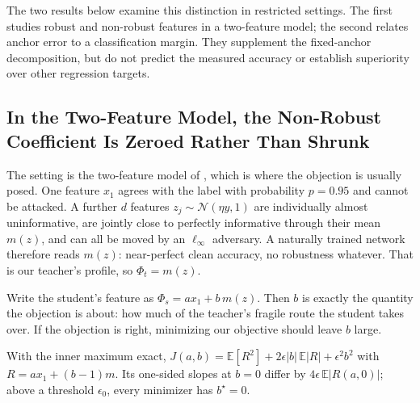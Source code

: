 The two results below examine this distinction in restricted settings. The first studies robust
and non-robust features in a two-feature model; the second relates anchor error to a classification
margin. They supplement the fixed-anchor decomposition, but do not predict the measured accuracy
or establish superiority over other regression targets.

\subsection{In the Two-Feature Model, the Non-Robust Coefficient Is Zeroed Rather Than Shrunk}

The setting is the two-feature model of \citet{tsipras2018robustness}, which is where the objection is
usually posed. One feature $x_1$ agrees with the label with probability $p = 0.95$ and cannot be
attacked. A further $d$ features $z_j \sim \mathcal{N}(\eta y, 1)$ are individually almost
uninformative, are jointly close to perfectly informative through their mean $m(z)$, and can all be
moved by an $\ell_\infty$ adversary. A naturally trained network therefore reads $m(z)$: near-perfect
clean accuracy, no robustness whatever. That is our teacher's profile, so $\Phi_t = m(z)$.

Write the student's feature as $\Phi_s = a x_1 + b\, m(z)$. Then $b$ is exactly the quantity the
objection is about: how much of the teacher's fragile route the student takes over. If the objection
is right, minimizing our objective should leave $b$ large.

\begin{proposition}
\label{prop:l1}
With the inner maximum exact,
$J(a,b) = \mathbb{E}[R^2] + 2\epsilon\lvert b\rvert\,\mathbb{E}\lvert R\rvert + \epsilon^2 b^2$ with
$R = a x_1 + (b-1)m$. Its one-sided slopes at $b=0$ differ by
$4\epsilon\,\mathbb{E}\lvert R(a,0)\rvert$; above a threshold $\epsilon_0$, every minimizer has
$b^\star = 0$.
\end{proposition}

